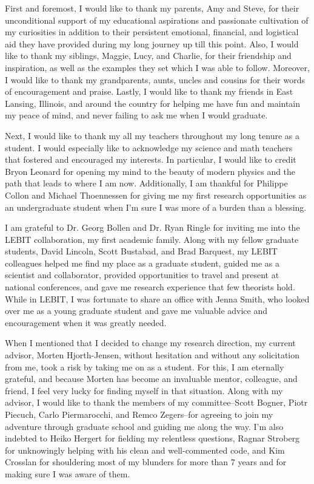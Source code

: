 \documentclass[../thesis.tex]{subfiles}
\begin{document}
First and foremost, I would like to thank my parents, Amy and Steve, for their unconditional support of my educational aspirations and passionate cultivation of my curiosities in addition to their persistent emotional, financial, and logistical aid they have provided during my long journey up till this point.  Also, I would like to thank my siblings, Maggie, Lucy, and Charlie, for their friendship and inspiration, as well as the examples they set which I was able to follow.  Moreover, I would like to thank my grandparents, aunts, uncles and cousins for their words of encouragement and praise.  Lastly, I would like to thank my friends in East Lansing, Illinois, and around the country for helping me have fun and maintain my peace of mind, and never failing to ask me when I would graduate.

Next, I would like to thank my all my teachers throughout my long tenure as a student.  I would especially like to acknowledge my science and math teachers that fostered and encouraged my interests.  In particular, I would like to credit Bryon Leonard for opening my mind to the beauty of modern physics and the path that leads to where I am now.  Additionally, I am thankful for Philippe Collon and Michael Thoennessen for giving me my first research opportunities as an undergraduate student when I'm sure I was more of a burden than a blessing.

I am grateful to Dr. Georg Bollen and Dr. Ryan Ringle for inviting me into the LEBIT collaboration, my first academic family.  Along with my fellow graduate students, David Lincoln, Scott Bustabad, and Brad Barquest, my LEBIT colleagues helped me find my place as a graduate student, guided me as a scientist and collaborator, provided opportunities to travel and present at national conferences, and gave me research experience that few theorists hold.  While in LEBIT, I was fortunate to share an office with Jenna Smith, who looked over me as a young graduate student and gave me valuable advice and encouragement when it was greatly needed.

When I mentioned that I decided to change my research direction, my current advisor, Morten Hjorth-Jensen, without hesitation and without any solicitation from me, took a risk by taking me on as a student.  For this, I am eternally grateful, and because Morten has become an invaluable mentor, colleague, and friend, I feel very lucky for finding myself in that situation.  Along with my advisor, I would like to thank the members of my committee--Scott Bogner, Piotr Piecuch, Carlo Piermarocchi, and Remco Zegers--for agreeing to join my adventure through graduate school and guiding me along the way.  I'm also indebted to Heiko Hergert for fielding my relentless questions, Ragnar Stroberg for unknowingly helping with his clean and well-commented code, and Kim Crosslan for shouldering most of my blunders for more than 7 years and for making sure I was aware of them.
\end{document}

